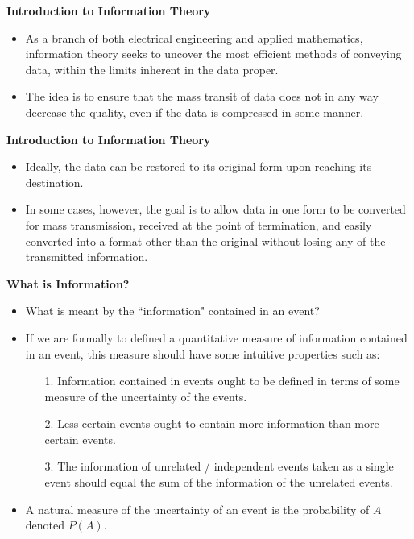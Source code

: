 \documentclass[a4]{beamer}
\begin{document}

\noindent \textbf{Introduction to Information Theory}
\begin{itemize}

\item As a branch of both electrical engineering and applied mathematics, information theory seeks to uncover the most efficient 
methods of conveying data, within the limits inherent in the data proper. \item The idea is to ensure that the mass transit of data does 
not in any way decrease the quality, even if the data is compressed in some manner. 
\end{itemize}


\noindent \textbf{Introduction to Information Theory}
\begin{itemize}
\item Ideally, the data can be restored to its original form upon reaching its destination. 
\item In some cases, however, the goal is to allow data in one form to be converted for mass transmission, 
received at the point of termination, and easily converted into a format other than the original without losing any of the transmitted information.
\end{itemize}


{
\noindent \textbf{What is Information?}

\begin{itemize} \item  What is meant by the ``information" contained in an event?
\item If we are formally to defined a quantitative measure of information contained in an event, this measure should have some intuitive properties such as:
\begin{itemize} \item [1.] Information contained in events ought to be defined in terms of some measure of the uncertainty of the events.
\item [2.] Less certain events ought to contain more information than more certain events.
\item [3.] The information of unrelated / independent events taken as a single event should equal the sum of the information of the unrelated events.
\end{itemize}

\item A natural measure of the uncertainty of an event is the probability of $A$ denoted $P(A)$.
\end{itemize}
}
\end{document}
